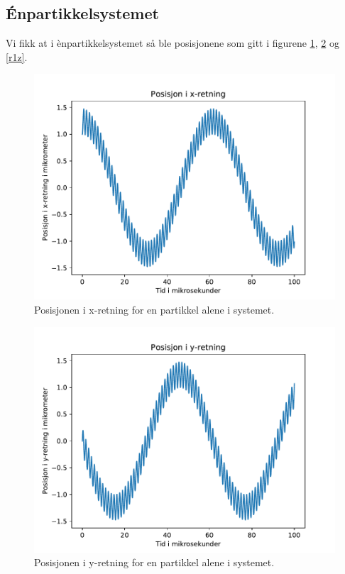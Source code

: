 \documentclass[reprint,english,notitlepage]{revtex4-1}  %
\begin{document}
\subsection*{Énpartikkelsystemet}
Vi fikk at i ènpartikkelsystemet så ble posisjonene som gitt i figurene \ref{r1x}, \ref{r1y} og \ref{r1z}.
\begin{figure}[H]
	\label{r1x}
	\centering 
	\includegraphics[scale=0.4]{../pythonplots/r1x.pdf}
	\caption{Posisjonen i x-retning for en partikkel alene i systemet.}
\end{figure}
\begin{figure}[H]
	\label{r1y}
	\centering 
	\includegraphics[scale=0.4]{../pythonplots/r1y.pdf}
	\caption{Posisjonen i y-retning for en partikkel alene i systemet.}
\end{figure}
\end{document}
